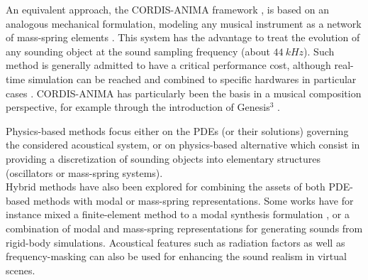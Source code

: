 {{					
					\label{subsubsubsubsec:CM_SS_Physics_SO_MSN}

An equivalent approach, the CORDIS-ANIMA framework , is based on an analogous mechanical formulation, modeling any musical instrument as a network of mass-spring elements . This system has the advantage to treat the evolution of any sounding object at the sound sampling frequency (about $44\ kHz$). Such method is generally admitted to have a critical performance cost, although real-time simulation can be reached and combined to specific hardwares in particular cases . CORDIS-ANIMA has particularly been the basis in a musical composition perspective, for example through the introduction of Genesis$^3$ . %


				\label{subsubsubsec:CM_SS_Conclusion}

Physics-based methods focus either on the PDEs (or their solutions) governing the considered acoustical system, or on physics-based alternative which consist in providing a discretization of sounding objects into elementary structures (oscillators or mass-spring systems).\\

Hybrid methods have also been explored for combining the assets of both PDE-based methods with modal or mass-spring representations. Some works have for instance mixed a finite-element method to a modal synthesis formulation , or a combination of modal and mass-spring representations  for generating sounds from rigid-body simulations. Acoustical features such as radiation factors  as well as frequency-masking can also be used  for enhancing the sound realism in virtual scenes.\\

}}
